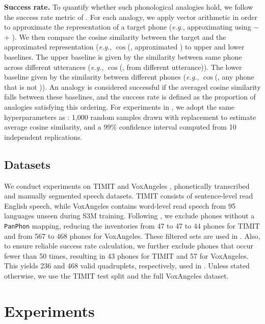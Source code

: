 \documentclass[cameraready]{Interspeech}
\begin{document}
\textbf{Success rate.}
To quantify whether such phonological analogies hold, we follow the success rate metric of \cite{choi2026self}.
For each analogy, we apply vector arithmetic in order to approximate the representation of a target phone (\textit{e.g.}, approximating \textipa{[p]} using \textipa{[b]} $-$ \textipa{[d]} $+$ \textipa{[t]}).
We then compare the cosine similarity between the target and the approximated representation (\textit{e.g.}, $\cos$(\textipa{[p]}, approximated \textipa{[p]}) to upper and lower baselines.
The upper baseline is given by the similarity between same phone across different utterances (\textit{e.g.}, $\cos$(\textipa{[p]}, \textipa{[p]} from different utterance)).
The lower baseline given by the similarity between different phones (\textit{e.g.}, $\cos$(\textipa{[p]}, any phone that is not \textipa{[p]})).
An analogy is considered successful if the averaged cosine similarity falls between these baselines, and the success rate is defined as the proportion of analogies satisfying this ordering.
For experiments in , we adopt the same hyperparameters as \cite{choi2026self}: 1{,}000 random samples drawn with replacement to estimate average cosine similarity, and a 99\% confidence interval computed from 10 independent replications.


\subsection{Datasets}
We conduct experiments on TIMIT \cite{garofolo1993darpa} and VoxAngeles \cite{chodroff2024voxangeles}, phonetically transcribed and manually segmented speech datasets.
TIMIT consists of sentence-level read English speech, while VoxAngeles contains word-level read speech from 95 languages unseen during S3M training.
Following \cite{choi2026self}, we exclude phones without a \texttt{PanPhon} mapping, reducing the inventories from 47 to 47 to 44 phones for TIMIT and from 567 to 468 phones for VoxAngeles.
These filtered sets are used in .
Also, to ensure reliable success rate calculation, we further exclude phones that occur fewer than 50 times, resulting in 43 phones for TIMIT and 57 for VoxAngeles.
This yields 236 and 468 valid quadruplets, respectively, used in .
Unless stated otherwise, we use the TIMIT test split and the full VoxAngeles dataset.



\section{Experiments}
\end{document}
